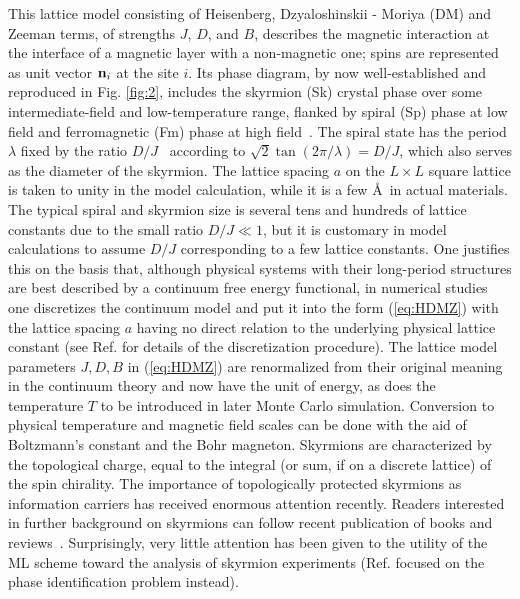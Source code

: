 \documentclass[reprint,amsmath,amssymb,aps,showpacs,superscriptaddress,prl]{revtex4-1}
\renewcommand{\v}[1]{{\bf #1}}
\begin{document}
This lattice model  consisting of Heisenberg, Dzyaloshinskii - Moriya (DM) and Zeeman terms, of strengths $J$, $D$, and $B$, describes the magnetic interaction at the interface of a magnetic layer with a non-magnetic one; spins are represented as unit vector $\v n_i$ at the site $i$. Its phase diagram, by now well-established and reproduced in Fig. \ref{fig:2}, includes the skyrmion (Sk) crystal phase over some intermediate-field and low-temperature range, flanked by spiral (Sp) phase at low field and ferromagnetic (Fm) phase at high field~\cite{nagaosa-review,skyrmion-book,jiang-review,fert-review,han-book}. The spiral state has the period $\lambda$ fixed by the ratio $D/J$~\cite{han09,han-book} according to $\sqrt{2}\tan (2\pi/\lambda)  = D/J$, which also serves as the diameter of the skyrmion. The lattice spacing $a$ on the $L\times L$ square lattice is taken to unity in the model calculation, while it is a few \AA~in actual materials.  The typical spiral and skyrmion size is several tens and hundreds of lattice constants due to the small ratio $D/J \ll 1$, but it is customary in model calculations to assume $D/J$ corresponding to a few lattice constants. One justifies this on the basis that, although physical systems with their long-period structures are best described by a continuum free energy functional, in numerical studies one discretizes the continuum model and put it into the form (\ref{eq:HDMZ}) with the lattice spacing $a$ having no direct relation to the underlying physical lattice constant (see Ref. \cite{han09,han-book} for details of the discretization procedure). The lattice model parameters $J, D, B$ in (\ref{eq:HDMZ}) are renormalized from their original meaning in the continuum theory and now have the unit of energy, as does the temperature $T$ to be introduced in later Monte Carlo simulation. Conversion to physical temperature and magnetic field scales can be done with the aid of Boltzmann's constant and the Bohr magneton. Skyrmions are characterized by the topological charge, equal to the integral (or sum, if on a discrete lattice) of the spin chirality. The importance of topologically protected skyrmions as information carriers has received enormous attention recently. Readers interested in further background on skyrmions can follow recent publication of books and reviews~\cite{nagaosa-review,skyrmion-book,jiang-review,fert-review,han-book}. Surprisingly, very little attention has been given to the utility of the ML scheme toward the analysis of skyrmion experiments (Ref. \cite{russian18} focused on the phase identification problem instead). 
\end{document}

